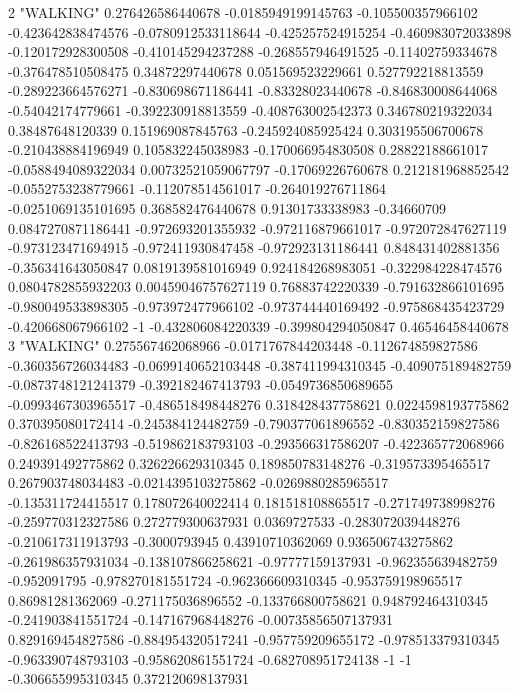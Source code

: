2 "WALKING" 0.276426586440678 -0.0185949199145763 -0.105500357966102 -0.423642838474576 -0.0780912533118644 -0.425257524915254 -0.460983072033898 -0.120172928300508 -0.410145294237288 -0.268557946491525 -0.11402759334678 -0.376478510508475 0.34872297440678 0.051569523229661 0.527792218813559 -0.289223664576271 -0.830698671186441 -0.83328023440678 -0.846830008644068 -0.54042174779661 -0.392230918813559 -0.408763002542373 0.346780219322034 0.38487648120339 0.151969087845763 -0.245924085925424 0.303195506700678 -0.210438884196949 0.105832245038983 -0.170066954830508 0.28822188661017 -0.0588494089322034 0.00732521059067797 -0.17069226760678 0.212181968852542 -0.0552753238779661 -0.112078514561017 -0.264019276711864 -0.0251069135101695 0.368582476440678 0.91301733338983 -0.34660709 0.0847270871186441 -0.972693201355932 -0.972116879661017 -0.972072847627119 -0.973123471694915 -0.972411930847458 -0.972923131186441 0.848431402881356 -0.356341643050847 0.0819139581016949 0.924184268983051 -0.322984228474576 0.0804782855932203 0.00459046757627119 0.76883742220339 -0.791632866101695 -0.980049533898305 -0.973972477966102 -0.973744440169492 -0.975868435423729 -0.420668067966102 -1 -0.432806084220339 -0.399804294050847 0.46546458440678
3 "WALKING" 0.275567462068966 -0.0171767844203448 -0.112674859827586 -0.360356726034483 -0.0699140652103448 -0.387411994310345 -0.409075189482759 -0.0873748121241379 -0.392182467413793 -0.0549736850689655 -0.0993467303965517 -0.486518498448276 0.318428437758621 0.0224598193775862 0.370395080172414 -0.245384124482759 -0.790377061896552 -0.830352159827586 -0.826168522413793 -0.519862183793103 -0.293566317586207 -0.422365772068966 0.249391492775862 0.326226629310345 0.189850783148276 -0.319573395465517 0.267903748034483 -0.0214395103275862 -0.0269880285965517 -0.135311724415517 0.178072640022414 0.181518108865517 -0.271749738998276 -0.259770312327586 0.272779300637931 0.0369727533 -0.283072039448276 -0.210617311913793 -0.3000793945 0.43910710362069 0.936506743275862 -0.261986357931034 -0.138107866258621 -0.97777159137931 -0.962355639482759 -0.952091795 -0.978270181551724 -0.962366609310345 -0.953759198965517 0.86981281362069 -0.271175036896552 -0.133766800758621 0.948792464310345 -0.241903841551724 -0.147167968448276 -0.00735856507137931 0.829169454827586 -0.884954320517241 -0.957759209655172 -0.978513379310345 -0.963390748793103 -0.958620861551724 -0.682708951724138 -1 -1 -0.306655995310345 0.372120698137931
